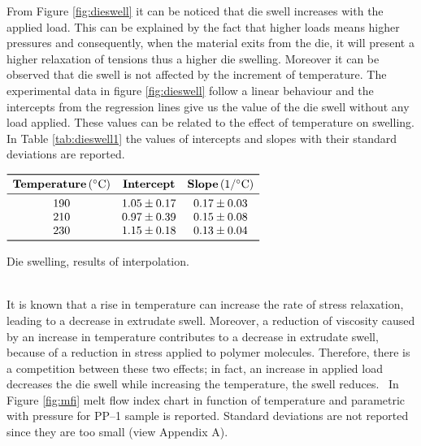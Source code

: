 \documentclass[a4paper, 11pt]{article}
\begin{document}
From Figure \ref{fig:dieswell} it can be noticed that die swell increases with the applied load. This can be explained by the fact that higher loads means higher pressures and consequently, when the material exits from the die, it will present a higher relaxation of tensions thus a higher die swelling. Moreover it can be observed that die swell is not affected by the increment of temperature. The experimental data in figure \ref{fig:dieswell} follow a linear behaviour and the intercepts from the regression lines give us the value of the die swell without any load applied. These values can be related to the effect of temperature on swelling.
In Table \ref{tab:dieswell1} the values of intercepts and slopes with their standard deviations are reported.
\begin{table}[htp]
	\centering
	$
	\begin{array}{ccc}
	\toprule
	\textbf{Temperature}\, (^\circ \text{C}) & \textbf{Intercept} & \textbf{Slope} \, (1/^\circ \text{C}) \\
	\midrule
	190 & 1.05 \pm 0.17 & 0.17 \pm 0.03 \\
	210 & 0.97 \pm 0.39 & 0.15 \pm 0.08 \\
	230 & 1.15 \pm 0.18 & 0.13 \pm 0.04 \\
	\bottomrule
	\end{array}
	$
	\caption{Die swelling, results of interpolation.}
	\label{tab:dieswell1}
\end{table}\\
It is known that a rise in temperature can increase the rate of stress relaxation, leading to a decrease in extrudate swell. Moreover, a reduction of viscosity caused by an increase in temperature contributes to a decrease in extrudate swell, because of a reduction in stress applied to polymer molecules.
Therefore, there is a competition between these two effects; in fact, an increase in applied load decreases the die swell while increasing the temperature, the swell reduces.~\cite{swell}
\newpage
In Figure \ref{fig:mfi} melt flow index chart in function of temperature and parametric with pressure for PP–1 sample is reported. Standard deviations are not reported since they are too small (view Appendix A).
\end{document}
